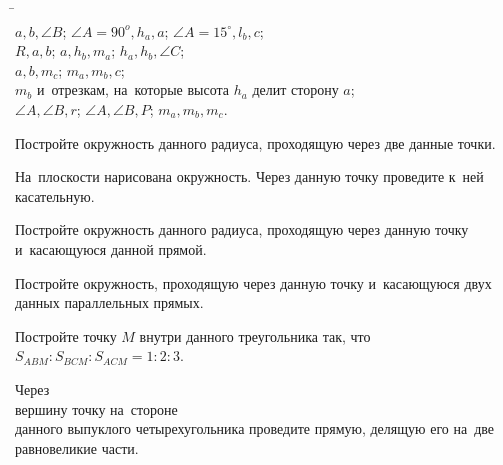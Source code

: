 \begin{problems}

\item\begin{tabbing}
\hspace{0.30\linewidth}\=
\hspace{0.30\linewidth}\=
\\
\subproblem $a, b, \angle B$;
\>
\subproblem $\angle A=90^o, h_{a}, a$;
\>
\subproblem $\angle A = 15^\circ, l_{b}, c$;
\\
\subproblem $R, a, b$;
\>
\subproblem $a, h_{b}, m_{a}$;
\>
\subproblem $h_{a}, h_{b}, \angle C$;
\\
\subproblem $a, b, m_{c}$;
\>
\subproblem $m_{a}, m_{b}, c$;
\\
\subproblem $m_{b}$ и~отрезкам, на~которые высота $h_{a}$ делит сторону $a$;
\\
\subproblem $\angle A, \angle B, r$;
\>
\subproblem $\angle A, \angle B, P$;
\>
\subproblem $m_{a}, m_{b}, m_{c}$.
\end{tabbing}


\item
Постройте окружность данного радиуса, проходящую через две данные точки.

\item
На~плоскости нарисована окружность.
Через данную точку проведите к~ней касательную.

\item
Постройте окружность данного радиуса, проходящую через данную точку
и~касающуюся данной прямой.

\item
Постройте окружность, проходящую через данную точку и~касающуюся двух данных
параллельных прямых.

\item
Постройте точку $M$ внутри данного треугольника так, что
$S_{ABM} : S_{BCM} : S_{ACM} = 1 : 2 : 3$.

\item
Через
\\
\subproblem вершину
\qquad
\subproblem точку на~стороне
\\
данного выпуклого четырехугольника проведите прямую, делящую его на~две
равновеликие части.

\end{problems}

